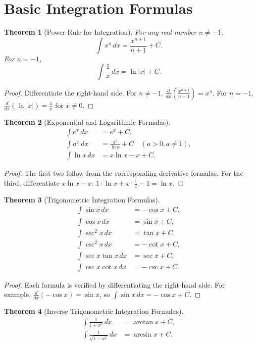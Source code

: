 \documentclass[11pt,a4paper]{article}
\newtheorem{theorem}{Theorem}
\begin{document}
\section{Basic Integration Formulas}
\begin{theorem}[Power Rule for Integration]
For any real number $n \neq -1$,
\[
\int x^n \, dx = \frac{x^{n+1}}{n+1} + C.
\]
For $n = -1$,
\[
\int \frac{1}{x} \, dx = \ln|x| + C.
\]
\end{theorem}
\begin{proof}
Differentiate the right-hand side. For $n \neq -1$, $\frac{d}{dx}\left(\frac{x^{n+1}}{n+1}\right) = x^n$. For $n = -1$, $\frac{d}{dx}(\ln|x|) = \frac{1}{x}$ for $x \neq 0$.
\end{proof}
\begin{theorem}[Exponential and Logarithmic Formulas]
\begin{align*}
\int e^x \, dx &= e^x + C, \\
\int a^x \, dx &= \frac{a^x}{\ln a} + C \quad (a > 0, a \neq 1), \\
\int \ln x \, dx &= x \ln x - x + C.
\end{align*}
\end{theorem}
\begin{proof}
The first two follow from the corresponding derivative formulas. For the third, differentiate $x \ln x - x$: $1 \cdot \ln x + x \cdot \frac{1}{x} - 1 = \ln x$.
\end{proof}
\begin{theorem}[Trigonometric Integration Formulas]
\begin{align*}
\int \sin x \, dx &= -\cos x + C, \\
\int \cos x \, dx &= \sin x + C, \\
\int \sec^2 x \, dx &= \tan x + C, \\
\int \csc^2 x \, dx &= -\cot x + C, \\
\int \sec x \tan x \, dx &= \sec x + C, \\
\int \csc x \cot x \, dx &= -\csc x + C.
\end{align*}
\end{theorem}
\begin{proof}
Each formula is verified by differentiating the right-hand side. For example, $\frac{d}{dx}(-\cos x) = \sin x$, so $\int \sin x \, dx = -\cos x + C$.
\end{proof}
\begin{theorem}[Inverse Trigonometric Integration Formulas]
\begin{align*}
\int \frac{1}{1+x^2} \, dx &= \arctan x + C, \\
\int \frac{1}{\sqrt{1-x^2}} \, dx &= \arcsin x + C.
\end{align*}
\end{theorem}
\end{document}
